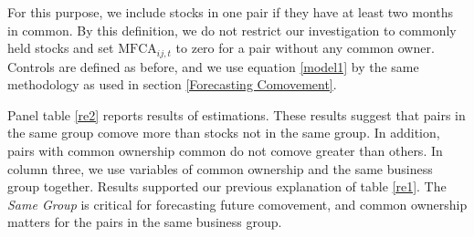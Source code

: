 	For this purpose, we include stocks in one pair if they have at least two months in common. By this definition, we do not restrict our investigation to commonly held stocks and set $\text{MFCA}_{ij,t}$ to zero for a pair without any common owner. Controls are defined as before, and we use equation \ref{model1} by the same methodology as used in section \ref{Forecasting Comovement}.
	
	Panel  table \ref{re2} reports results of estimations. These results suggest that pairs in the same group comove more than stocks not in the same group. In addition, pairs with common ownership common do not comove greater than others. In column three, we use variables of common ownership and the same business group together. Results supported our previous explanation of table \ref{re1}. The \textit{Same Group} is critical for forecasting future comovement, and common ownership matters for the pairs in the same business group.
					
%							
					
